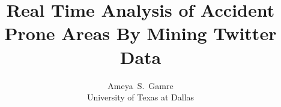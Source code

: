 \documentclass[journal]{IEEEtran}
\begin{document}


%
\title{Real Time Analysis of Accident Prone Areas By Mining Twitter Data}
%
%
%

\author{\begin{center}
		Ameya~S.~Gamre
	\end{center} \newline
        \begin{center}
        	University of Texas at Dallas
        \end{center}} %

% 
%
\end{document}
